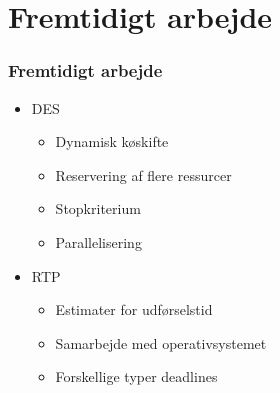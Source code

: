 \documentclass[12pt]{beamer}
\begin{document}
\section{Fremtidigt arbejde}
\begin{frame}
  	\frametitle{Fremtidigt arbejde}
\begin{itemize}
\item DES
	\begin{itemize}
	\item Dynamisk køskifte
	\item Reservering af flere ressurcer
	\item Stopkriterium
	\item Parallelisering
	\end{itemize}
\item RTP
	\begin{itemize}
	\item Estimater for udførselstid
	\item Samarbejde med operativsystemet
	\item Forskellige typer deadlines
	\end{itemize}
\end{itemize}
\end{frame}
 







\end{document}
